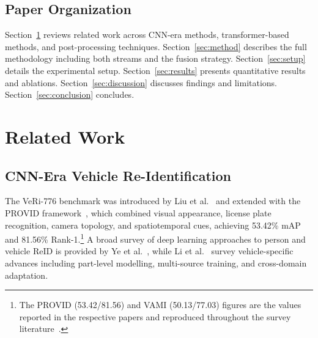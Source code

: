 \documentclass[11pt]{article}
\begin{document}
\subsection{Paper Organization}
Section~\ref{sec:related} reviews related work across CNN-era methods,
transformer-based methods, and post-processing techniques.
Section~\ref{sec:method} describes the full methodology including both streams
and the fusion strategy. Section~\ref{sec:setup} details the experimental
setup. Section~\ref{sec:results} presents quantitative results and ablations.
Section~\ref{sec:discussion} discusses findings and limitations.
Section~\ref{sec:conclusion} concludes.

\section{Related Work}
\label{sec:related}

\subsection{CNN-Era Vehicle Re-Identification}
The VeRi-776 benchmark was introduced by Liu et al.~\cite{liu2016veri} and
extended with the PROVID framework~\cite{liu2018provid}, which combined visual
appearance, license plate recognition, camera topology, and spatiotemporal cues,
achieving 53.42\% mAP and 81.56\% Rank-1.\footnote{The PROVID (53.42/81.56)
and VAMI (50.13/77.03) figures are the values reported in the respective
papers and reproduced throughout the survey
literature~\cite{ye2021reidsurvey,li2024vehiclereidsurvey}.}
A broad survey of deep learning approaches to person and vehicle ReID is
provided by Ye et al.~\cite{ye2021reidsurvey}, while Li et al.~\cite{li2024vehiclereidsurvey}
survey vehicle-specific advances including part-level modelling, multi-source
training, and cross-domain adaptation.
\end{document}
